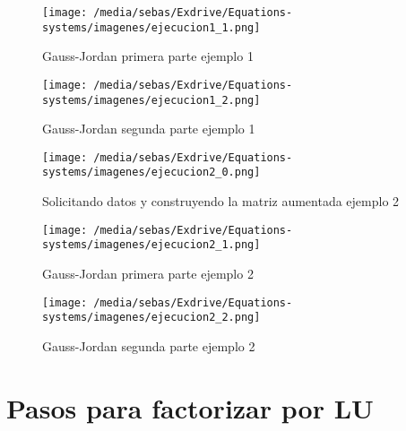 \documentclass[letterpaper,12pt]{article}
\begin{document}
\begin{figure}[htbp]
    \centering
    \texttt{[image: /media/sebas/Exdrive/Equations-systems/imagenes/ejecucion1\_1.png]}
    \caption{Gauss-Jordan primera parte ejemplo 1}
    \label{fig: Gauss-Jordan primera parte ejemplo 1}
\end{figure}

\begin{figure}[htbp]
    \centering
    \texttt{[image: /media/sebas/Exdrive/Equations-systems/imagenes/ejecucion1\_2.png]}
    \caption{Gauss-Jordan segunda parte ejemplo 1}
    \label{fig: Gauss-Jordan segunda parte ejemplo 1}
\end{figure}

\begin{figure}[htbp]
    \centering
    \texttt{[image: /media/sebas/Exdrive/Equations-systems/imagenes/ejecucion2\_0.png]}
    \caption{Solicitando datos y construyendo la matriz aumentada ejemplo 2}
    \label{fig: Matriz aumentada ejemplo 2}
\end{figure}

\begin{figure}[htbp]
    \centering
    \texttt{[image: /media/sebas/Exdrive/Equations-systems/imagenes/ejecucion2\_1.png]}
    \caption{Gauss-Jordan primera parte ejemplo 2}
    \label{fig: Gauss-Jordan primera parte ejemplo 2}
\end{figure}

\begin{figure}[htbp]
    \centering
    \texttt{[image: /media/sebas/Exdrive/Equations-systems/imagenes/ejecucion2\_2.png]}
    \caption{Gauss-Jordan segunda parte ejemplo 2}
    \label{fig: Gauss-Jordan segunda parte ejemplo 2}
\end{figure}

\section{Pasos para factorizar por LU}
\end{document}
